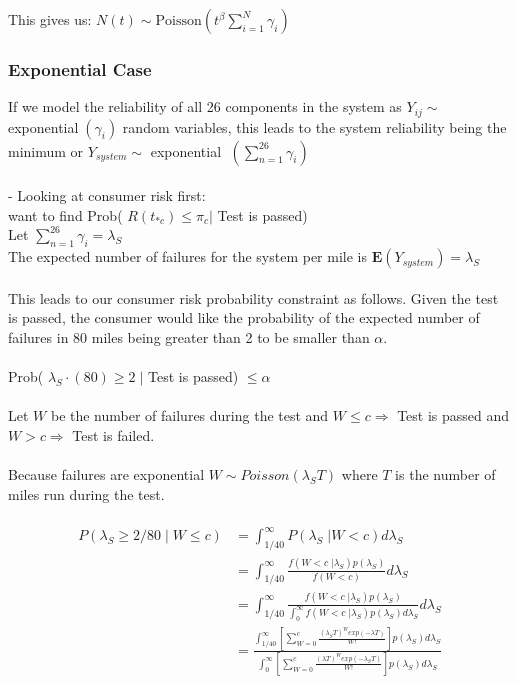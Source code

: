 \documentclass[12pt]{article}
\begin{document}
This gives us: $N(t) \sim \text{Poisson}(t^\beta \sum_{i = 1}^N \gamma_i)$

\subsubsection{Exponential Case}

If we model the reliability of all 26 components in the system as $Y_{ij} \sim$
exponential$\;(\gamma_i) $ random variables, this leads to the system
reliability being the minimum or $Y_{system} \sim $ exponential
$ \;(\sum_{n = 1}^{26} \gamma_i) $
\\
\\
- Looking at consumer risk first:
\\
want to find Prob( $ R(t_{*c}) \leq \pi_c \vert $ Test is passed)
\\
Let $ \sum_{n = 1}^{26} \gamma_i = \lambda_S $
\\
The expected number of failures for the system per mile is
$ \mathbf{E}(Y_{system}) = \lambda_S $
\\
\\
This leads to our consumer risk probability constraint as follows.  Given the
test is passed, the consumer would like the probability of the expected number
of failures in 80 miles being greater than 2 to be smaller than $\alpha$.
\\
\\
Prob( $ \lambda_S \cdot (80) \geq 2 \; \vert $ Test is passed) $ \leq \alpha $
\\
\\
Let $ W $ be the number of failures during the test and $ W \leq c \Rightarrow $
Test is passed and $ W > c \Rightarrow $ Test is failed.
\\
\\
Because failures are exponential $ W \sim Poisson(\lambda_S T) $ where $ T $ is
the number of miles run during the test.
\\
\\
$$
\begin{aligned}
	 P(\lambda_S \geq 2/80 \; \vert \; W \leq c) &= \int_{1/40}^{\infty} P(\lambda_S \; \vert W < c) d\lambda_S \\
     &= \int_{1/40}^{\infty} \frac{f(W < c \; \vert \lambda_S) p(\lambda_S)}{f(W < c)}d\lambda_S\\
     &= \int_{1/40}^{\infty} \frac{f(W < c \; \vert \lambda_S) p(\lambda_S)}{\int_{0}^{\infty} f(W < c \; \vert \lambda_S) p(\lambda_S) d\lambda_S}d\lambda_S \\
     &= \frac{\int_{1/40}^{\infty} [ \sum_{W=0}^c \frac{(\lambda_S T)^W exp(-\lambda T)}{W!}]p(\lambda_S)d\lambda_S} {\int_{0}^{\infty} [ \sum_{W=0}^c \frac{(\lambda T)^W exp(-\lambda_S T)}{W!}]p(\lambda_S)d\lambda_S}
\end{aligned}
$$
\end{document}
